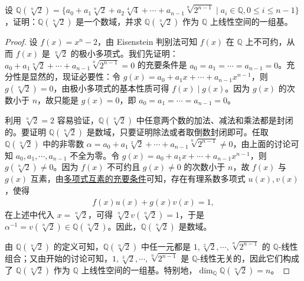 \documentclass[../../main.tex]{subfiles}%
\begin{document}
\begin{example}
设 $\mathbb{Q}(\sqrt[n]{2}) = \{a_0 + a_1 \sqrt[n]{2} + a_2 \sqrt[4]{4} + \cdots + a_{n-1} \sqrt[n]{2^{n-1}} \mid a_i \in \mathbb{Q}, 0 \leqslant  i \leqslant  n - 1\}$，证明：$\mathbb{Q}(\sqrt[n]{2})$ 是一个数域，并求 $\mathbb{Q}(\sqrt[n]{2})$ 作为 $\mathbb{Q}$ 上线性空间的一组基。
\end{example}
\begin{proof}

设 $f(x) = x^n - 2$，由 Eisenstein 判别法可知 $f(x)$ 在 $\mathbb{Q}$ 上不可约，从而 $f(x)$ 是 $\sqrt[n]{2}$ 的极小多项式。我们先证明：$a_0 + a_1 \sqrt[n]{2} + \cdots + a_{n-1} \sqrt[n]{2^{n-1}} = 0$ 的充要条件是 $a_0 = a_1 = \cdots = a_{n-1} = 0$。充分性是显然的，现证必要性：令 $g(x) = a_0 + a_1 x + \cdots + a_{n-1} x^{n-1}$，则 $g(\sqrt[n]{2}) = 0$，由极小多项式的基本性质可得 $f(x) \mid g(x)$。因为 $g(x)$ 的次数小于 $n$，故只能是 $g(x) = 0$，即 $a_0 = a_1 = \cdots = a_{n-1} = 0$。

利用 $\sqrt[n]{2} = 2$ 容易验证，$\mathbb{Q}(\sqrt[n]{2})$ 中任意两个数的加法、减法和乘法都是封闭的。要证明 $\mathbb{Q}(\sqrt[n]{2})$ 是数域，只要证明除法或者取倒数封闭即可。任取 $\mathbb{Q}(\sqrt[n]{2})$ 中的非零数 $\alpha = a_0 + a_1 \sqrt[2]{2} + \cdots + a_{n-1} \sqrt[n]{2^{n-1}} \neq 0$，由上面的讨论可知 $a_0, a_1, \cdots, a_{n-1}$ 不全为零。令 $g(x) = a_0 + a_1 x + \cdots + a_{n-1} x^{n-1}$，则 $g(\sqrt[n]{2}) \neq 0$。因为 $f(x)$ 不可约且 $g(x) \neq 0$ 的次数小于 $n$，故 $f(x)$ 与 $g(x)$ 互素，由\hyperref[theorem:多项式互素的充要条件]{多项式互素的充要条件}可知，存在有理系数多项式 $u(x), v(x)$，使得
\begin{align*}
f(x)u(x) + g(x)v(x) = 1,
\end{align*}
在上述中代入 $x = \sqrt[n]{2}$，可得 $\sqrt[n]{2} v(\sqrt[n]{2}) = 1$，于是 $\alpha^{-1} = v(\sqrt[n]{2}) \in \mathbb{Q}(\sqrt[n]{2})$。因此，$\mathbb{Q}(\sqrt[n]{2})$ 是数域。

由 $\mathbb{Q}(\sqrt[n]{2})$ 的定义可知，$\mathbb{Q}(\sqrt[n]{2})$ 中任一元都是 $1, \sqrt[2]{2}, \cdots, \sqrt[n]{2^{n-1}}$ 的 $\mathbb{Q}$-线性组合；又由开始的讨论可知，$1, \sqrt[2]{2}, \cdots, \sqrt[n]{2^{n-1}}$ 是 $\mathbb{Q}$-线性无关的，因此它们构成了 $\mathbb{Q}(\sqrt[n]{2})$ 作为 $\mathbb{Q}$ 上线性空间的一组基。特别地，$\dim_{\mathbb{Q}} \mathbb{Q}(\sqrt[n]{2}) = n$。

\end{proof}
\end{document}
